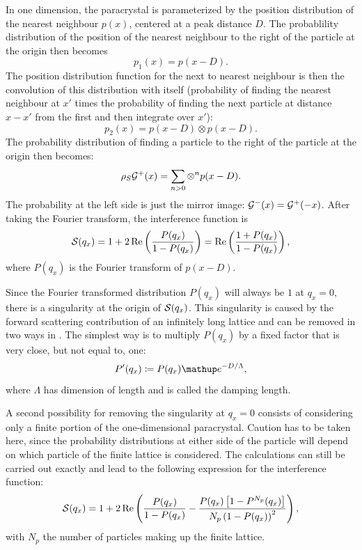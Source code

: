 In one dimension, the paracrystal is parameterized by the
position distribution of the nearest neighbour $p(x)$, centered at a peak distance $D$.
The probablility
distribution of the position of the nearest neighbour to the right of the particle at the origin then becomes
\begin{equation}
  p_1(x) = p(x-D).
\end{equation}
The position distribution function for the next to nearest neighbour is then the convolution of this distribution with itself
(probability of finding the nearest neighbour at $x'$ times the probability of finding the next particle at distance $x-x'$ from the first and
then integrate over $x'$):
\begin{equation}
  p_2(x) = p(x-D) \otimes p(x-D).
\end{equation}
The probability distribution of finding a particle to the right of the particle at the origin then becomes:
\begin{equation}
  \rho_S \mathcal{G}^+(x) = \sum_{n>0} \otimes^n p(x-D).
\end{equation}
The probability at the left side is just the mirror image: $\mathcal{G}^-(x) = \mathcal{G}^+(-x)$.
After taking the Fourier transform, the interference function is
\begin{equation}
  \mathcal{S}(q_x) = 1 + 2\operatorname{Re}\left(\frac{P(q_x)}{1-P(q_x)}\right) = \operatorname{Re}\left(\frac{1+P(q_x)}{1-P(q_x)}\right),
\end{equation}
where $P(q_x)$ is the Fourier transform of $p(x-D)$.

Since the Fourier transformed distribution $P(q_x)$ will always be $1$ at $q_x=0$, there is a singularity at the origin of $\mathcal{S}(q_x)$.
This singularity is caused by the forward scattering contribution of an infinitely long lattice and can be removed in two ways in \BornAgain.
The simplest way is to multiply $P(q_x)$ by a fixed factor that is very close, but not equal to, one:
\begin{equation}
  P'(q_x) \coloneqq P(q_x) \e^{-D/\Lambda},
\end{equation}
where $\Lambda$ has dimension of length and is called the damping length.

A second possibility for removing the singularity at $q_x=0$ consists of considering only a finite portion of the one-dimensional
paracrystal. Caution has to be taken here, since the probability distributions at either side of the particle will depend on which particle
of the finite lattice is considered. The calculations can still be carried out exactly and lead to the following expression for the
interference function:
\begin{equation}
   \mathcal{S}(q_x) = 1 + 2\operatorname{Re}\left( \frac{P(q_x)}{1-P(q_x)} - \frac{P(q_x)\left[1-P^{N_p}(q_x)\right]}{N_p\left( 1 - P(q_x) \right)^2} \right),
\end{equation}
with $N_p$ the number of particles making up the finite lattice.

